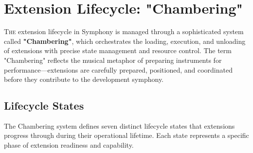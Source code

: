 
\section{Extension Lifecycle: "Chambering"}
\label{sec:extension-lifecycle-chambering}

\lettrine{T}{he} extension lifecycle in Symphony is managed through a sophisticated system called \textbf{"Chambering"}, which orchestrates the loading, execution, and unloading of extensions with precise state management and resource control. The term "Chambering" reflects the musical metaphor of preparing instruments for performance—extensions are carefully prepared, positioned, and coordinated before they contribute to the development symphony.

\subsection{Lifecycle States}
\label{subsec:lifecycle-states}

The Chambering system defines seven distinct lifecycle states that extensions progress through during their operational lifetime. Each state represents a specific phase of extension readiness and capability.


